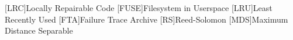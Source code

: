 \begin{acronym}
[LRC]{Locally Repairable Code}
[FUSE]{Filesystem in Userspace}
[LRU]{Least Recently Used}
[FTA]{Failure Trace Archive}
[RS]{Reed-Solomon}
[MDS]{Maximum Distance Separable}
\end{acronym}
